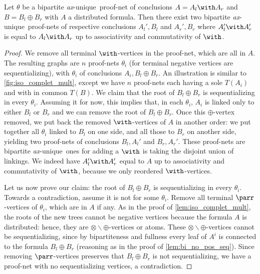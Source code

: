 \documentclass{lmcs}
\newcommand*{\tens}{\otimes} %
\newcommand*{\tp}{\tens\backslash\oplus} %
\newcommand*{\unique}{\textit{ax}-unique}
\begin{document}
\begin{lem}
\label{lem:iso_complet_add}
Let $\theta$ be a bipartite \unique\ proof-net of conclusions $A=A_l\with A_r$ and $B=B_l\oplus B_r$ with $A$ a distributed formula.
Then there exist two bipartite \unique\ proof-nets of respective conclusions $A_l',B_l$ and $A_r',B_r$ where $A_l'\with A_r'$ is equal to $A_l\with A_r$ up to associativity and commutativity of $\with$.
\end{lem}
\begin{proof}
We remove all terminal $\with$-vertices in the proof-net, which are all in $A$.
The resulting graphs are $n$ proof-nets $\theta_i$ (for terminal negative vertices are sequentializing), with $\theta_i$ of conclusions $A_i,B_l\oplus B_r$.
An illustration is similar to \autoref{fig:iso_complet_mult}, except we have $n$ proof-nets each having a sole $T(A_i)$ and with in common $T(B)$.
We claim that the root of $B_l\oplus B_r$ is sequentializing in every $\theta_i$.
Assuming it for now, this implies that, in each $\theta_i$, $A_i$ is linked only to either $B_l$ or $B_r$ and we can remove the root of $B_l\oplus B_r$.
Once this $\oplus$-vertex removed, we put back the removed $\with$-vertices of $A$ in another order: we put together all $\theta_i$ linked to $B_l$ on one side, and all those to $B_r$ on another side, yielding two proof-nets of conclusions $B_l,A_l'$ and $B_r,A_r'$.
These proof-nets are bipartite \unique\ ones for adding a $\with$ is taking the disjoint union of linkings.
We indeed have $A_l'\with A_r'$ equal to $A$ up to associativity and commutativity of $\with$, because we only reordered $\with$-vertices.

Let us now prove our claim: the root of $B_l\oplus B_r$ is sequentializing in every $\theta_i$.
Towards a contradiction, assume it is not for some $\theta_i$.
Remove all terminal $\parr$-vertices of $\theta_i$, which are in $A$ if any.
As in the proof of \autoref{lem:iso_complet_mult}, the roots of the new trees cannot be negative vertices because the formula $A$ is distributed: hence, they are $\tp$-vertices or atoms.
These $\tp$-vertices cannot be sequentializing, since by bipartiteness and fullness every leaf of $A^i$ is connected to the formula $B_l\oplus B_r$ (reasoning as in the proof of \autoref{lem:bi_no_pos_seq}).
Since removing $\parr$-vertices preserves that $B_l\oplus B_r$ is not sequentializing, we have a proof-net with no sequentializing vertices, a contradiction.
\end{proof}
\end{document}
